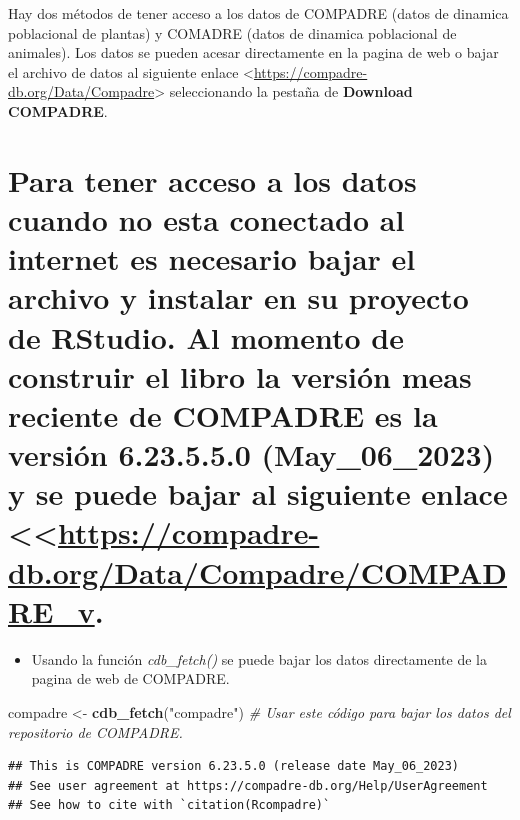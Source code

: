 \documentclass[
]{book}
\newenvironment{Shaded}{\begin{snugshade}}{\end{snugshade}}
\newcommand{\CommentTok}[1]{\textcolor[rgb]{0.56,0.35,0.01}{\textit{#1}}}
\newcommand{\FunctionTok}[1]{\textcolor[rgb]{0.13,0.29,0.53}{\textbf{#1}}}
\newcommand{\NormalTok}[1]{#1}
\newcommand{\OtherTok}[1]{\textcolor[rgb]{0.56,0.35,0.01}{#1}}
\newcommand{\StringTok}[1]{\textcolor[rgb]{0.31,0.60,0.02}{#1}}
\providecommand{\tightlist}{%
  \setlength{\itemsep}{0pt}\setlength{\parskip}{0pt}}
\theoremstyle{definition}
\theoremstyle{definition}
\theoremstyle{definition}
\theoremstyle{definition}
\theoremstyle{remark}
\begin{document}
Hay dos métodos de tener acceso a los datos de COMPADRE (datos de dinamica poblacional de plantas) y COMADRE (datos de dinamica poblacional de animales). Los datos se pueden acesar directamente en la pagina de web o bajar el archivo de datos al siguiente enlace \textless{}\url{https://compadre-db.org/Data/Compadre}\textgreater{} seleccionando la pestaña de \textbf{Download COMPADRE}.

\section{\texorpdfstring{Para tener acceso a los datos cuando no esta conectado al internet es necesario bajar el archivo y instalar en su proyecto de RStudio. Al momento de construir el libro la versión meas reciente de COMPADRE es la versión 6.23.5.5.0 (May\_06\_2023) y se puede bajar al siguiente enlace \textless\textless{}\url{https://compadre-db.org/Data/Compadre/COMPADRE_v}.}{Para tener acceso a los datos cuando no esta conectado al internet es necesario bajar el archivo y instalar en su proyecto de RStudio. Al momento de construir el libro la versión meas reciente de COMPADRE es la versión 6.23.5.5.0 (May\_06\_2023) y se puede bajar al siguiente enlace \textless\textless https://compadre-db.org/Data/Compadre/COMPADRE\_v.}}\label{para-tener-acceso-a-los-datos-cuando-no-esta-conectado-al-internet-es-necesario-bajar-el-archivo-y-instalar-en-su-proyecto-de-rstudio.-al-momento-de-construir-el-libro-la-versiuxf3n-meas-reciente-de-compadre-es-la-versiuxf3n-6.23.5.5.0-may_06_2023-y-se-puede-bajar-al-siguiente-enlace-httpscompadre-db.orgdatacompadrecompadre_v.}

\begin{itemize}
\tightlist
\item
  Usando la función \emph{cdb\_fetch()} se puede bajar los datos directamente de la pagina de web de COMPADRE.
\end{itemize}

\begin{Shaded}
\begin{Highlighting}[]
\NormalTok{compadre }\OtherTok{\textless{}{-}} \FunctionTok{cdb\_fetch}\NormalTok{(}\StringTok{"compadre"}\NormalTok{) }\CommentTok{\# Usar este código para bajar los datos del repositorio de COMPADRE. }
\end{Highlighting}
\end{Shaded}

\begin{verbatim}
## This is COMPADRE version 6.23.5.0 (release date May_06_2023)
## See user agreement at https://compadre-db.org/Help/UserAgreement
## See how to cite with `citation(Rcompadre)`
\end{verbatim}
\end{document}
